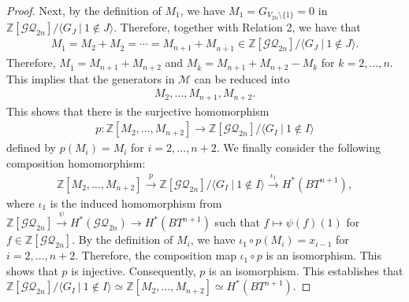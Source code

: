 \documentclass[12pt]{amsart}
\theoremstyle{remark}
\numberwithin{equation}{section}
\begin{document}
\begin{proof}
Next, 
by the definition of $M_{1}$, we have $M_{1}=G_{V_{2n}\setminus\{1\}}=0$ 
in $\mathbb{Z}[\mathcal{GQ}_{2n}]/\langle G_{J}\ |\ 1\not\in J \rangle$.
Therefore, together with Relation 2, we have that 
\begin{align*}
M_{\overline{1}}=M_{2}+M_{\overline{2}}=\cdots =M_{n+1}+M_{\overline{n+1}}\in \mathbb{Z}[\mathcal{GQ}_{2n}]/\langle G_{J}\ |\ 1\not\in J \rangle.
\end{align*}
Therefore, $M_{\overline{1}}=M_{n+1}+M_{n+2}$ and $M_{\overline{k}}=M_{n+1}+M_{n+2}-M_{k}$ for $k=2,\ldots, n$.
This implies that the generators in $\mathcal{M}$ can be reduced into 
\begin{align*}
M_{2}, \ldots, M_{n+1}, M_{n+2}. 
\end{align*}
This shows that there is the surjective homomorphism 
\begin{align*}
p:\mathbb{Z}[M_{2},\ldots, M_{n+2}]\to \mathbb{Z}[\mathcal{GQ}_{2n}]/\langle G_{I}\ |\ 1\not\in I \rangle
\end{align*}
defined by $p(M_{i})=M_{i}$ for $i=2,\ldots, n+2$.
We finally consider the following composition homomorphism:
\begin{align*}
\mathbb{Z}[M_{2},\ldots, M_{n+2}]\stackrel{p}{\to} \mathbb{Z}[\mathcal{GQ}_{2n}]/\langle G_{I}\ |\ 1\not\in I \rangle 
\stackrel{\iota_{1}}{\to} H^{*}(BT^{n+1}),
\end{align*}
where 
$\iota_{1}$ is the induced homomorphism from 
$\mathbb{Z}[\mathcal{GQ}_{2n}]\stackrel{\psi}{\to} H^{*}(\mathcal{GQ}_{2n})\to H^{*}(BT^{n+1})$ such that $f\mapsto \psi(f)(1)$ for $f\in \mathbb{Z}[\mathcal{GQ}_{2n}]$. 
By the definition of $M_{i}$, we have $\iota_{1}\circ p(M_{i})=x_{i-1}$ for $i=2,\ldots, n+2$.
Therefore, the composition map $\iota_{1}\circ p$ is an isomorphism.
This shows that $p$ is injective.
Consequently, $p$ is an isomorphism.
This establishes that  
$\mathbb{Z}[\mathcal{GQ}_{2n}]/\langle G_{I}\ |\ 1\not\in I \rangle\simeq  \mathbb{Z}[M_{2},\ldots, M_{n+2}]\simeq  H^{*}(BT^{n+1})$.
\end{proof}

\end{document}
